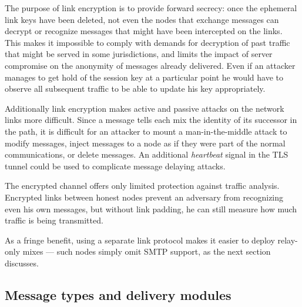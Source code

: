 \documentclass[final]{ieee}
\begin{document}
The purpose of link encryption is to provide forward secrecy: 
once the ephemeral link keys have been deleted, not even the
nodes that exchange messages can decrypt or recognize messages
that might have been intercepted on the links. This makes it
impossible to comply with demands for decryption of past traffic 
that might be served in
some jurisdictions, and limits the impact of server compromise on the
anonymity 
of messages already delivered.
Even if an
attacker manages to get hold of the session key at a particular point
he would have to observe all subsequent traffic to be able to update
his key appropriately.

Additionally link encryption makes active and passive attacks on the
network links more difficult. Since a message tells each mix the identity
of its successor in the path, it is difficult for an attacker to
mount a man-in-the-middle attack to modify messages, inject messages
to a node as if they were part of the normal communications, or delete
messages.  An additional \emph{heartbeat} signal in the TLS tunnel
could be used to complicate message delaying attacks.

The encrypted channel offers only limited protection against traffic
analysis. Encrypted links between honest nodes prevent an adversary
from recognizing even his own messages, but without link padding, he
can still measure how much traffic is being transmitted.

As a fringe benefit, using a separate link protocol makes it
easier to deploy relay-only mixes --- such nodes simply omit SMTP
support, as the next section discusses.  

\subsection{Message types and delivery modules}
\label{subsec:delivery-modules}
\end{document}
